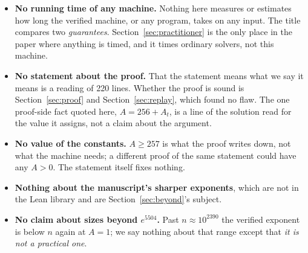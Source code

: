 \begin{itemize}
\item \textbf{No running time of any machine.} Nothing here measures or
  estimates how long the verified machine, or any program, takes on any
  input. The title compares two \emph{guarantees}.
  Section~\ref{sec:practitioner} is the only place in the paper where
  anything is timed, and it times ordinary solvers, not this machine.
\item \textbf{No statement about the proof.} That the statement means
  what we say it means is a reading of 220 lines. Whether the proof is
  sound is Section~\ref{sec:proof} and Section~\ref{sec:replay}, which
  found no flaw. The one proof-side fact quoted here, $A = 256 + A_t$,
  is a line of the solution read for the value it assigns, not a claim
  about the argument.
\item \textbf{No value of the constants.} $A \ge 257$ is what the proof
  writes down, not what the machine needs; a different proof of the
  same statement could have any $A > 0$. The statement itself fixes
  nothing.
\item \textbf{Nothing about the manuscript's sharper exponents}, which
  are not in the Lean library and are Section~\ref{sec:beyond}'s
  subject.
\item \textbf{No claim about sizes beyond $e^{5504}$.} Past
  $n \approx 10^{2390}$ the verified exponent is below $n$ again at
  $A = 1$; we say nothing about that range except that \emph{it is not a
  practical one}.
\end{itemize}
\par\endgroup

